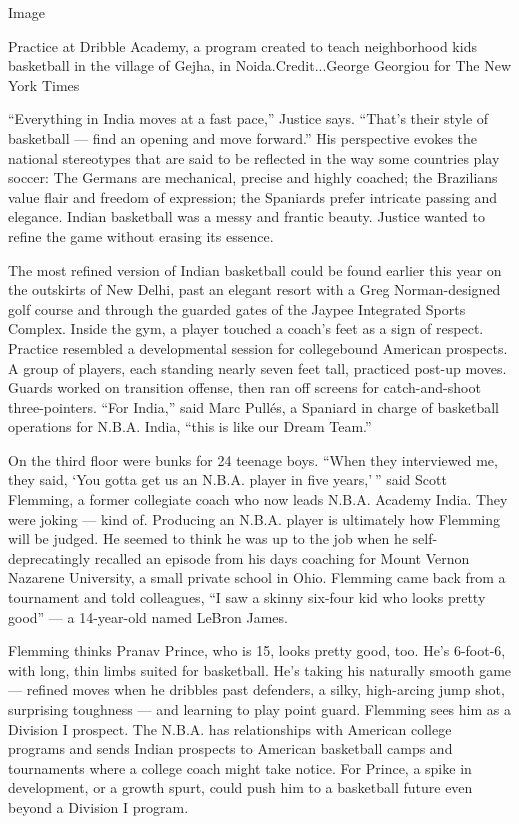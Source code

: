 Image

Practice at Dribble Academy, a program created to teach neighborhood
kids basketball in the village of Gejha, in Noida.Credit...George
Georgiou for The New York Times

``Everything in India moves at a fast pace,'' Justice says. ``That's
their style of basketball --- find an opening and move forward.'' His
perspective evokes the national stereotypes that are said to be
reflected in the way some countries play soccer: The Germans are
mechanical, precise and highly coached; the Brazilians value flair and
freedom of expression; the Spaniards prefer intricate passing and
elegance. Indian basketball was a messy and frantic beauty. Justice
wanted to refine the game without erasing its essence.

The most refined version of Indian basketball could be found earlier
this year on the outskirts of New Delhi, past an elegant resort with a
Greg Norman-designed golf course and through the guarded gates of the
Jaypee Integrated Sports Complex. Inside the gym, a player touched a
coach's feet as a sign of respect. Practice resembled a developmental
session for collegebound American prospects. A group of players, each
standing nearly seven feet tall, practiced post-up moves. Guards worked
on transition offense, then ran off screens for catch-and-shoot
three-pointers. ``For India,'' said Marc Pullés, a Spaniard in charge of
basketball operations for N.B.A. India, ``this is like our Dream Team.''

On the third floor were bunks for 24 teenage boys. ``When they
interviewed me, they said, `You gotta get us an N.B.A. player in five
years,' '' said Scott Flemming, a former collegiate coach who now leads
N.B.A. Academy India. They were joking --- kind of. Producing an N.B.A.
player is ultimately how Flemming will be judged. He seemed to think he
was up to the job when he self-deprecatingly recalled an episode from
his days coaching for Mount Vernon Nazarene University, a small private
school in Ohio. Flemming came back from a tournament and told
colleagues, ``I saw a skinny six-four kid who looks pretty good'' --- a
14-year-old named LeBron James.

Flemming thinks Pranav Prince, who is 15, looks pretty good, too. He's
6-foot-6, with long, thin limbs suited for basketball. He's taking his
naturally smooth game --- refined moves when he dribbles past defenders,
a silky, high-arcing jump shot, surprising toughness --- and learning to
play point guard. Flemming sees him as a Division I prospect. The N.B.A.
has relationships with American college programs and sends Indian
prospects to American basketball camps and tournaments where a college
coach might take notice. For Prince, a spike in development, or a growth
spurt, could push him to a basketball future even beyond a Division I
program.


